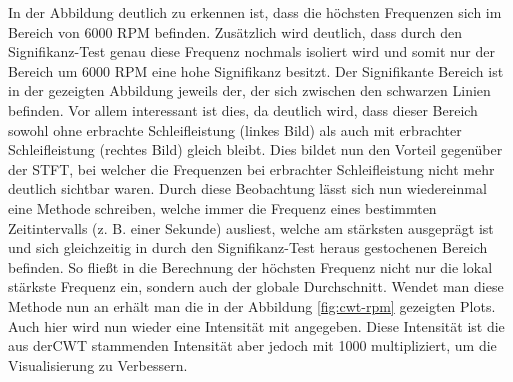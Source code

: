 In der Abbildung deutlich zu erkennen ist, dass die höchsten Frequenzen sich im Bereich von 6000 RPM befinden. Zusätzlich wird deutlich, dass durch den Signifikanz-Test genau diese Frequenz nochmals isoliert wird und somit nur der Bereich um 6000 RPM eine hohe Signifikanz besitzt. Der Signifikante Bereich ist in der gezeigten Abbildung jeweils der, der sich zwischen den schwarzen Linien befinden. Vor allem interessant ist dies, da deutlich wird, dass dieser Bereich sowohl ohne erbrachte Schleifleistung (linkes Bild) als auch mit erbrachter Schleifleistung (rechtes Bild) gleich bleibt. Dies bildet nun den Vorteil gegenüber der \ac{STFT}, bei welcher die Frequenzen bei erbrachter Schleifleistung nicht mehr deutlich sichtbar waren. Durch diese Beobachtung lässt sich nun wiedereinmal eine Methode schreiben, welche immer die Frequenz eines bestimmten Zeitintervalls (z. B. einer Sekunde) ausliest, welche am stärksten ausgeprägt ist und sich gleichzeitig in durch den Signifikanz-Test heraus gestochenen Bereich befinden. So fließt in die Berechnung der höchsten Frequenz nicht nur die lokal stärkste Frequenz ein, sondern auch der globale Durchschnitt. Wendet man diese Methode nun an erhält man die in der Abbildung \ref{fig:cwt-rpm} gezeigten Plots. Auch hier wird nun wieder eine Intensität mit angegeben. Diese Intensität ist die aus der\ac{CWT} stammenden Intensität aber jedoch mit 1000 multipliziert, um die Visualisierung zu Verbessern. 

